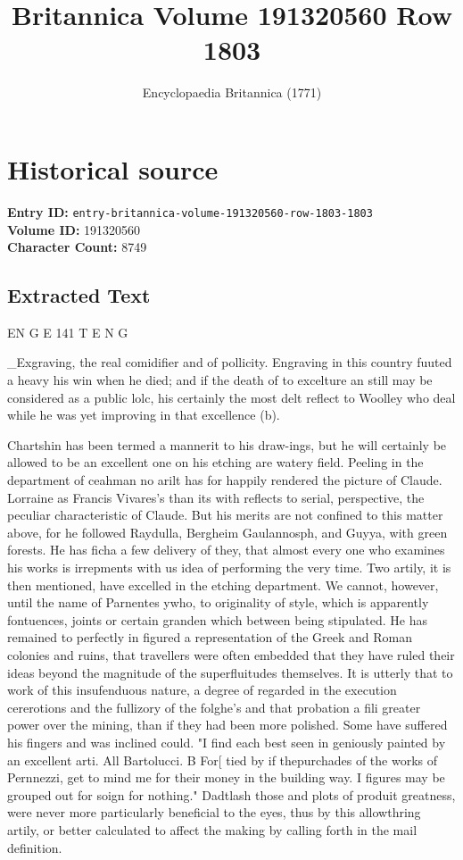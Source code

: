 \documentclass{article}
\title{Britannica Volume 191320560 Row 1803}
\date{Encyclopaedia Britannica (1771)}
\begin{document}
\maketitle

\section*{Historical source}
\textbf{Entry ID:} \texttt{entry-britannica-volume-191320560-row-1803-1803} \\
\textbf{Volume ID:} 191320560 \\
\textbf{Character Count:} 8749

\subsection*{Extracted Text}
EN G E 141 T E N G

\_Exgraving, the real comidifier and of pollicity. Engraving in this country fuuted a heavy his win when he died; and if the death of to excelture an still may be considered as a public lolc, his certainly the most delt reflect to Woolley who deal while he was yet improving in that excellence (b).

Chartshin has been termed a mannerit to his draw-ings, but he will certainly be allowed to be an excellent one on his etching are watery field. Peeling in the department of ceahman no arilt has for happily rendered the picture of Claude. Lorraine as Francis Vivares’s than its with reflects to serial, perspective, the peculiar characteristic of Claude. But his merits are not confined to this matter above, for he followed Raydulla, Bergheim Gaulannosph, and Guyya, with green forests. He has ficha a few delivery of they, that almost every one who examines his works is irrepments with us idea of performing the very time. Two artily, it is then mentioned, have excelled in the etching department. We cannot, however, until the name of Parnentes ywho, to originality of style, which is apparently fontuences, joints or certain granden which between being stipulated. He has remained to perfectly in figured a representation of the Greek and Roman colonies and ruins, that travellers were often embedded that they have ruled their ideas beyond the magnitude of the superfluitudes themselves. It is utterly that to work of this insufenduous nature, a degree of regarded in the execution cererotions and the fullizory of the folghe's and that probation a fili greater power over the mining, than if they had been more polished. Some have suffered his fingers and was inclined could. "I find each best seen in geniously painted by an excellent arti. All Bartolucci. B For[ tied by if thepurchades of the works of Pernnezzi, get to mind me for their money in the building way. I figures may be grouped out for soign for nothing." Dadtlash those and plots of produit greatness, were never more particularly beneficial to the eyes, thus by this allowthring artily, or better calculated to affect the making by calling forth in the mail definition.
\end{document}
